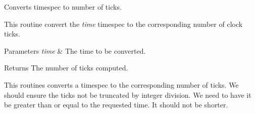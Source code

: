 Converts timespec to number of ticks. 

This routine convert the {\itshape time} timespec to the corresponding number of clock ticks.


\begin{DoxyParams}{Parameters}
{\em time} & The time to be converted.\\
\hline
\end{DoxyParams}
\begin{DoxyReturn}{Returns}
The number of ticks computed.
\end{DoxyReturn}
This routines converts a timespec to the corresponding number of ticks. We should ensure the ticks not be truncated by integer division. We need to have it be greater than or equal to the requested time. It should not be shorter.
